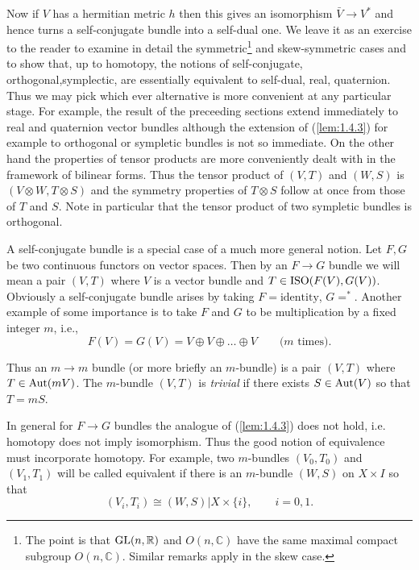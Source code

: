 Now if $V$ has a hermitian metric $h$ then this gives an isomorphism $\bar{V} \to V^*$ and hence turns a self-conjugate bundle into a self-dual one. We leave it as an exercise to the reader to examine in detail the symmetric\footnote{The point is that $\operatorname{GL}(n, \mathbb{R})$ and $O(n, \mathbb{C})$ have the same maximal compact subgroup $O(n, \mathbb{C})$. Similar remarks apply in the skew case.} and skew-symmetric cases and to show that, up to homotopy, the notions of self-conjugate, orthogonal,symplectic, are essentially equivalent to self-dual, real, quaternion. Thus we may pick which ever alternative is more convenient at any particular stage. For example, the result of the preceeding sections extend immediately to real and quaternion vector bundles although the extension of (\ref{lem:1.4.3}) for example to orthogonal or sympletic bundles is not so immediate. On the other hand the properties of tensor products are more conveniently dealt with in the framework of bilinear forms. Thus the tensor product of $(V, T)$ and $(W, S)$ is $(V \otimes W, T \otimes S)$ and the symmetry properties of $T \otimes S$ follow at once from those of $T$ and $S$. Note in particular that the tensor product of two sympletic bundles is orthogonal. \par \hfill

A self-conjugate bundle is a special case of a much more general notion. Let $F, G$ be two continuous functors on vector spaces. Then by an $F \to G$ bundle we will mean a pair $(V, T)$ where $V$ is a vector bundle and $T \in \operatorname{ISO}(F(V), G(V))$. Obviously a self-conjugate bundle arises by taking $F = \text{identity}$, $G = ^*$. Another example of some importance is to take $F$ and $G$ to be multiplication by a fixed integer $m$, i.e.,
\begin{equation*}
    F(V) = G(V) = V \oplus V \oplus \ldots \oplus V \qquad \text{($m$ times).}
\end{equation*}

Thus an $m \to m$ bundle (or more briefly an $m$-bundle) is a pair $(V, T)$ where $T \in \operatorname{Aut}(mV)$. The $m$-bundle $(V, T)$ is \textit{trivial} if there exists $S \in \operatorname{Aut}(V)$ so that $T = mS$. \par 

In general for $F \to G$ bundles the analogue of (\ref{lem:1.4.3}) does not hold, i.e. homotopy does not imply isomorphism. Thus the good notion of equivalence must incorporate homotopy. For example, two $m$-bundles $(V_0, T_0)$ and $(V_1, T_1)$ will be called equivalent if there is an $m$-bundle $(W, S)$ on $X \times I$ so that
\begin{equation*}
    (V_i, T_i) \cong (W, S) \vert X \times \{i\}, \qquad i = 0, 1.
\end{equation*}

